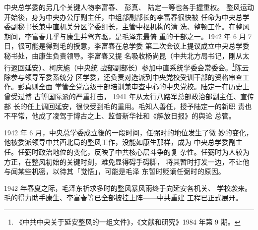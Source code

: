 中央总学委的另几个关键人物李富春、
彭真、
陆定一等也各手握重权。
整风运动开始後，身为中央办公厅副主任，中组部副部长的李富春很快被
任命为中央总学委副秘书长兼中直机关分区学委组长，主管中枢机构的清
洗、整顿工作。在整风期间，李富春几乎与康生并驾齐驱，是毛泽东最倚
重的干部之一。1942 年 6 月 7 日，很可能是得到毛的授意，李富春在总学委
第二次会议上提议成立中央总学委秘书处，由康生负责领导。李富春又提
名吸收杨尚昆（中共北方局书记，刚从太行返回延安）、柯庆施（中央统
战部副部长）参加中直系统学委会常委会。\footnote{《中共中央关于延安整风的一组文件》，《文献和研究》1984 年第 9 期。}陈云除参与领导军委系统分
区学委，还负责对选派到中央党校受训干部的资格审查工作。彭真则全面
掌管全党高级干部培训兼审查中心的中央党校。陆定一在历史上曾受过博
古等国际派的严重打击， 1941 年从太行八路军总部政治部副主任、宣传部
长的任上调回延安，很快受到毛的重用。毛知人善任，授予陆定一的新职
责也不平常，他成了凌驾于博古之上、监督新华社和《解放日报》的舆论
总管。

1942 年 6 月，中央总学委成立後的一段时间，任弼时的地位发生了微
妙的变化，他被委派领导中共西北局的整风工作，没能如康生那样，成为
中央总学委副主任。任弼时政治地位的变化，反映了中共核心层斗争的复
杂性。任弼时为人较为方正，在整风初始的关键时刻，难免显得碍手碍脚，
将其暂时打发一边，不让他与闻某些机密，以待其「觉悟」，可能是毛泽
东暂时贬谪任弼时的原因。

1942 年春夏之际，毛泽东祈求多时的整风暴风雨终于向延安各机关、
学校袭来。毛的得力助手康生、李富春等已全部披挂上阵——中共重建
工程已正式展开。
